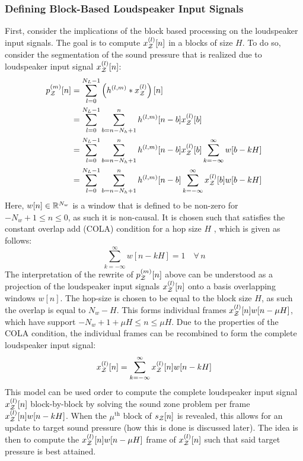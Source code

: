 \subsubsection*{Defining Block-Based Loudspeaker Input Signals}
First, consider the implications of the block based processing on the loudspeaker input signals.
The goal is to compute $x^{(l)}_{\mathcal{Z}}[n]$ in a blocks of size $H$.
To do so, consider the segmentation of the sound pressure that is realized due to loudspeaker input signal $x^{(l)}_{\mathcal{Z}}[n]$:
\begin{align}
    p_{\mathcal{Z}}^{(m)}[n] &= \sum_{l=0}^{N_L - 1} \left(h^{(l,m)} \ast x^{(l)}_{\mathcal{Z}}\right)[n] \\
               &= \sum_{l=0}^{N_L - 1} \sum_{b = n - N_h + 1}^{n} h^{(l,m)}[n - b] x^{(l)}_{\mathcal{Z}}[b] \\
               &= \sum_{l=0}^{N_L - 1} \sum_{b = n - N_h + 1}^{n} h^{(l,m)}[n - b] x^{(l)}_{\mathcal{Z}}[b] \sum_{k=-\infty}^{\infty} w[b - kH]\\
               &= \sum_{l=0}^{N_L - 1} \sum_{b = n - N_h + 1}^{n} h^{(l,m)}[n - b] \sum_{k=-\infty}^{\infty} x^{(l)}_{\mathcal{Z}}[b] w[b - kH]\\
\end{align}
Here, $w[n]\in\mathbb{R}^{N_w}$ is a window that is defined to be non-zero for $-N_w + 1 \leq n \leq 0$, as such it is non-causal.
It is chosen such that satisfies the constant overlap add (COLA) condition for a hop size $H$ , which is given as follows:
\begin{equation}
    \sum_{k=-\infty}^{\infty} w[n - kH] = 1\quad\forall\,n
\end{equation}
The interpretation of the rewrite of $p_{\mathcal{Z}}^{(m)}[n]$ above can be understood as a projection of the loudspeaker input signals $x^{(l)}_{\mathcal{Z}}[n]$ onto a basis overlapping windows $w[n]$.
The hop-size is chosen to be equal to the block size $H$, as such the overlap is equal to $N_w - H$. 
This forms individual frames $x^{(l)}_{\mathcal{Z}}[n]w[n - \mu H]$, which have support $-N_w + 1 + \mu H \leq n \leq \mu H$.
Due to the properties of the COLA condition, the individual frames can be recombined to form the complete loudspeaker input signal:
\begin{equation}
    x^{(l)}_{\mathcal{Z}}[n] = \sum_{k=-\infty}^{\infty} x^{(l)}_{\mathcal{Z}}[n] w[n - kH]
\end{equation}
This model can be used order to compute the complete loudspeaker input signal $x^{(l)}_{\mathcal{Z}}[n]$ block-by-block by solving the sound zone problem per frame $x^{(l)}_{\mathcal{Z}}[n] w[n - kH]$.
When the $\mu^\text{th}$ block of $s_{\mathcal{Z}}[n]$ is revealed, this allows for an update to target sound pressure (how this is done is discussed later).
The idea is then to compute the $x^{(l)}_{\mathcal{Z}}[n] w[n - \mu H]$ frame of $x^{(l)}_{\mathcal{Z}}[n]$ such that said target pressure is best attained.

